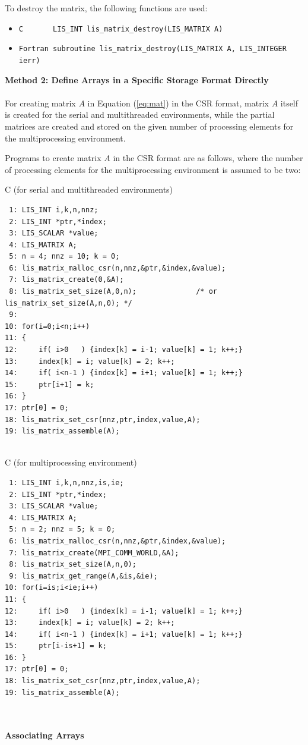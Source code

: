 \documentclass[a4paper]{article}
\begin{document}
To destroy the matrix, the following functions are used:
\begin{itemize}
\item \verb|C       LIS_INT lis_matrix_destroy(LIS_MATRIX A)|
\item \verb|Fortran subroutine lis_matrix_destroy(LIS_MATRIX A, LIS_INTEGER ierr)|
\end{itemize}
\vspace*{5mm}

\noindent
{\bf Method 2: Define Arrays in a Specific Storage Format Directly}\\
\\ 
\indent
For creating matrix $A$ in Equation (\ref{eq:mat}) in the
CSR format, 
matrix $A$ itself is created for the serial and multithreaded environments,
while the partial matrices are created and 
stored on the given number of processing elements 
for the multiprocessing environment.

Programs to create matrix $A$ in the CSR format are as follows,
where the number of processing elements for the multiprocessing environment is assumed to be two: 
\begin{itemsquarebox}[l]{C (for serial and multithreaded environments)}
\small
\begin{verbatim}
 1: LIS_INT i,k,n,nnz;
 2: LIS_INT *ptr,*index;
 3: LIS_SCALAR *value;
 4: LIS_MATRIX A;
 5: n = 4; nnz = 10; k = 0;
 6: lis_matrix_malloc_csr(n,nnz,&ptr,&index,&value);
 7: lis_matrix_create(0,&A);
 8: lis_matrix_set_size(A,0,n);              /* or lis_matrix_set_size(A,n,0); */ 
 9: 
10: for(i=0;i<n;i++)
11: {
12:     if( i>0   ) {index[k] = i-1; value[k] = 1; k++;}
13:     index[k] = i; value[k] = 2; k++;
14:     if( i<n-1 ) {index[k] = i+1; value[k] = 1; k++;}
15:     ptr[i+1] = k;
16: }
17: ptr[0] = 0;
18: lis_matrix_set_csr(nnz,ptr,index,value,A);
19: lis_matrix_assemble(A); 


\end{verbatim}
\end{itemsquarebox}
\begin{itemsquarebox}[l]{C (for multiprocessing environment)}
\small
\begin{verbatim}
 1: LIS_INT i,k,n,nnz,is,ie;
 2: LIS_INT *ptr,*index;
 3: LIS_SCALAR *value;
 4: LIS_MATRIX A;
 5: n = 2; nnz = 5; k = 0;
 6: lis_matrix_malloc_csr(n,nnz,&ptr,&index,&value);
 7: lis_matrix_create(MPI_COMM_WORLD,&A);
 8: lis_matrix_set_size(A,n,0);
 9: lis_matrix_get_range(A,&is,&ie);
10: for(i=is;i<ie;i++)
11: {
12:     if( i>0   ) {index[k] = i-1; value[k] = 1; k++;}
13:     index[k] = i; value[k] = 2; k++;
14:     if( i<n-1 ) {index[k] = i+1; value[k] = 1; k++;}
15:     ptr[i-is+1] = k;
16: }
17: ptr[0] = 0;
18: lis_matrix_set_csr(nnz,ptr,index,value,A);
19: lis_matrix_assemble(A); 
\end{verbatim}
\end{itemsquarebox}
\\ \\
\noindent
{\bf Associating Arrays}
\end{document}
